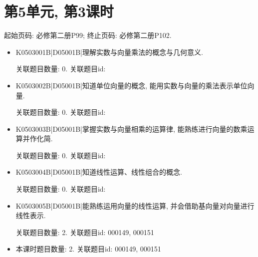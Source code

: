 \section*{第5单元, 第3课时}
起始页码: 必修第二册P99; 终止页码: 必修第二册P102.
\begin{itemize}
\item K0503001B|D05001B|理解实数与向量乘法的概念与几何意义.

关联题目数量: 0. 关联题目id: 

\item K0503002B|D05001B|知道单位向量的概念, 能用实数与向量的乘法表示单位向量.

关联题目数量: 0. 关联题目id: 

\item K0503003B|D05001B|掌握实数与向量相乘的运算律, 能熟练进行向量的数乘运算并作化简.

关联题目数量: 0. 关联题目id: 

\item K0503004B|D05001B|知道线性运算、线性组合的概念.

关联题目数量: 0. 关联题目id: 

\item K0503005B|D05001B|能熟练运用向量的线性运算, 并会借助基向量对向量进行线性表示.

关联题目数量: 2. 关联题目id: 000149, 000151

\item 本课时题目数量: 2. 关联题目id: 000149, 000151

\end{itemize}

